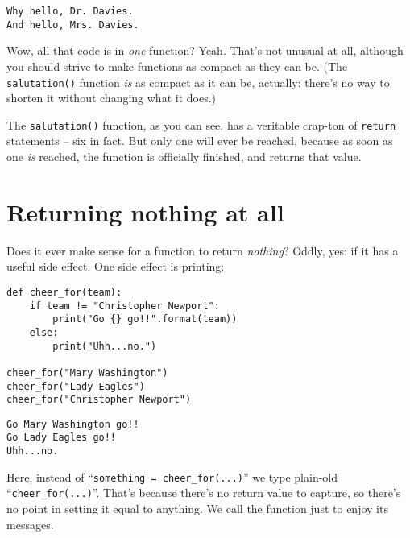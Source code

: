 \begin{Verbatim}[fontsize=\small,samepage=true,frame=leftline,framesep=5mm,framerule=1mm]
Why hello, Dr. Davies.
And hello, Mrs. Davies.
\end{Verbatim}

Wow, all that code is in \textit{one} function? Yeah. That's not unusual at
all, although you should strive to make functions as compact as they can be.
(The \texttt{salutation()} function \textit{is} as compact as it can be,
actually: there's no way to shorten it without changing what it does.)

\smallskip

The \texttt{salutation()} function, as you can see, has a veritable crap-ton of
\texttt{return} statements -- six in fact. But only one will ever be reached,
because as soon as one \textit{is} reached, the function is officially
finished, and returns that value.

\pagebreak
\section{Returning nothing at all}

Does it ever make sense for a function to return \textit{nothing}? Oddly, yes:
if it has a useful side effect. One side effect is printing:

\begin{Verbatim}[fontsize=\small,samepage=true,frame=single,framesep=3mm]
def cheer_for(team):
    if team != "Christopher Newport":
        print("Go {} go!!".format(team))
    else:
        print("Uhh...no.")

cheer_for("Mary Washington")
cheer_for("Lady Eagles")
cheer_for("Christopher Newport")
\end{Verbatim}
\vspace{-.5in}

\begin{Verbatim}[fontsize=\small,samepage=true,frame=leftline,framesep=5mm,framerule=1mm]
Go Mary Washington go!!
Go Lady Eagles go!!
Uhh...no.
\end{Verbatim}

Here, instead of ``\texttt{something = cheer\_for(...)}'' we type plain-old
``\texttt{cheer\_for(...)}''. That's because there's no return value to
capture, so there's no point in setting it equal to anything. We call the
function just to enjoy its messages.

\bigskip


